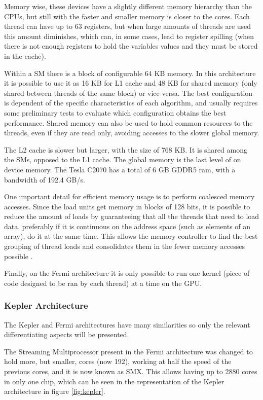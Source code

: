 Memory wise, these devices have a slightly different memory hierarchy than the CPUs, but still with the faster and smaller memory is closer to the \cuda cores. Each \cuda thread can have up to 63 registers, but when large amounts of threads are used this amount diminishes, which can, in some cases, lead to register spilling (when there is not enough registers to hold the variables values and they must be stored in the cache).

Within a SM there is a block of configurable 64 KB memory. In this architecture it is possible to use it as 16 KB for L1 cache and 48 KB for shared memory (only shared between threads of the same block) or vice versa. The best configuration is dependent of the specific characteristics of each algorithm, and usually requires some preliminary tests to evaluate which configuration obtains the best performance. Shared memory can also be used to hold common resources to the threads, even if they are read only, avoiding accesses to the slower global memory.

The L2 cache is slower but larger, with the size of 768 KB. It is shared among the SMs, opposed to the L1 cache. The global memory is the last level of on device memory. The Tesla C2070 has a total of 6 GB GDDR5 ram, with a bandwidth of 192.4 GB/s.

One important detail for efficient memory usage is to perform coalesced memory accesses. Since the load units get memory in blocks of 128 bits, it is possible to reduce the amount of loads by guaranteeing that all the threads that need to load data, preferably if it is continuous on the address space (such as elements of an array), do it at the same time. This allows the memory controller to find the best grouping of thread loads and consolidates them in the fewer memory accesses possible \cite{NVIDIA:Fermi}.

Finally, on the Fermi architecture it is only possible to run one kernel (piece of \cuda code designed to be ran by each \cuda thread) at a time on the GPU.

\subsubsection{\nvidia Kepler Architecture}

The Kepler and Fermi architectures have many similarities so only the relevant differentiating aspects will be presented.

The Streaming Multiprocessor present in the Fermi architecture was changed to hold more, but smaller, \cuda cores (now 192), working at half the speed of the previous \cuda cores, and it is now known as SMX. This allows having up to 2880 \cuda cores in only one chip, which can be seen in the representation of the Kepler architecture in figure \ref{fig:kepler}.


